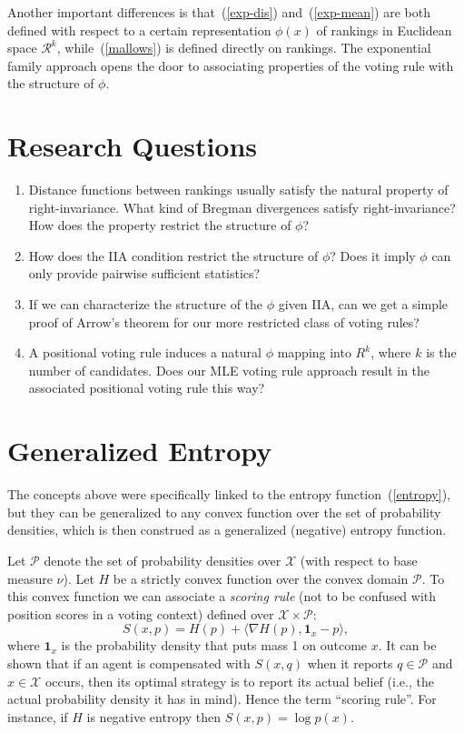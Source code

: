 \documentclass[10pt,letterpaper]{article}
\newcommand{\X}{\ensuremath{\mathcal{X}}}
\newcommand{\R}{\ensuremath{\mathcal{R}}}
\newcommand{\mP}{\ensuremath{\mathcal{P}}}
\newcommand{\ip}[2]{\ensuremath{\langle #1, #2 \rangle}}
\newcommand{\grad}{\nabla}
\newcommand{\one}{\ensuremath{\mathbf{1}}}
\begin{document}
Another important differences is that~(\ref{exp-dis}) and~(\ref{exp-mean}) are both defined with respect to a certain representation $\phi(x)$ of rankings in Euclidean space $\R^k$, while~(\ref{mallows}) is defined directly on rankings. The exponential family approach opens the door to associating properties of the voting rule with the structure of $\phi$.


\section{Research Questions}

\begin{enumerate}
\item Distance functions between rankings usually satisfy the natural property of right-invariance. What kind of Bregman divergences satisfy right-invariance? How does the property restrict the structure of $\phi$?
\item How does the IIA condition restrict the structure of $\phi$? Does it imply $\phi$ can only provide pairwise sufficient statistics?
\item If we can characterize the structure of the $\phi$ given IIA, can we get a simple proof of Arrow's theorem for our more restricted class of voting rules?
\item A positional voting rule induces a natural $\phi$ mapping into $R^k$, where $k$ is the number of candidates. Does our MLE voting rule approach result in the associated positional voting rule this way?
\end{enumerate}


\pagebreak
\appendix

\section{Generalized Entropy}

The concepts above were specifically linked to the entropy function~(\ref{entropy}), but they can be generalized to any convex function over the set of probability densities, which is then construed as a generalized (negative) entropy function.

Let $\mP$ denote the set of probability densities over $\X$ (with respect to base measure $\nu$). Let $H$ be a strictly convex function over the convex domain $\mP$. To this convex function we can associate a \emph{scoring rule} (not to be confused with position scores in a voting context) defined over $\X \times \mP$:
%
\[
S(x, p) = H(p) + \ip{\grad H(p)}{\one_x - p},
\]
%
where $\one_x$ is the probability density that puts mass 1 on outcome $x$. It can be shown that if an agent is compensated with $S(x,q)$ when it reports $q \in \mP$ and $x \in \X$ occurs, then its optimal strategy is to report its actual belief (i.e., the actual probability density it has in mind). Hence the term ``scoring rule''. For instance, if $H$ is negative entropy then $S(x,p) = \log p(x)$.
\end{document}
